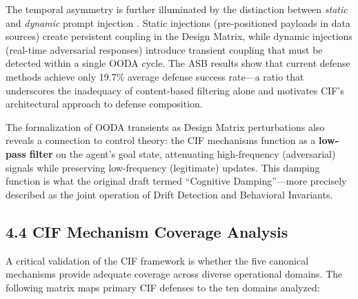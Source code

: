 \documentclass[
]{article}
\begin{document}
The temporal asymmetry is further illuminated by the distinction between
\emph{static} and \emph{dynamic} prompt injection
\cite{liu2024formalizing}. Static injections (pre-positioned payloads in
data sources) create persistent coupling in the Design Matrix, while
dynamic injections (real-time adversarial responses) introduce transient
coupling that must be detected within a single OODA cycle. The ASB
results show that current defense methods achieve only 19.7\% average
defense success rate---a ratio that underscores the inadequacy of
content-based filtering alone and motivates CIF's architectural approach
to defense composition.

The formalization of OODA transients as Design Matrix perturbations also
reveals a connection to control theory: the CIF mechanisms function as a
\textbf{low-pass filter} on the agent's goal state, attenuating
high-frequency (adversarial) signals while preserving low-frequency
(legitimate) updates. This damping function is what the original draft
termed ``Cognitive Damping''---more precisely described as the joint
operation of Drift Detection and Behavioral Invariants.

\subsection{4.4 CIF Mechanism Coverage
Analysis}\label{sec:mechanism_coverage}

A critical validation of the CIF framework is whether the five canonical
mechanisms provide adequate coverage across diverse operational domains.
The following matrix maps primary CIF defenses to the ten domains
analyzed:
\end{document}
